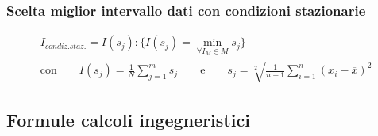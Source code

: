 \documentclass[a4paper,10pt]{article}                                                                                       %
\begin{document}
\subsubsection{Scelta miglior intervallo dati con condizioni stazionarie}                                                   %
\label{subsubsec:daf_interv}                                                                                                %
\vspace{1mm}                                                                                                                %
\begin{equation}                                                                                                            %
  \begin{aligned}                                                                                                           %
  I_{condiz.staz.} = I(s_j) : \{I(s_j) = \min_{\forall I_M \in M} s_j\}\qquad\qquad                                         %
  \\\text{con}\qquad                                                                                                        %
  I(s_j) = \frac{1}{N}\sum_{j=1}^{m}{s_j}                                                                                   %
  \qquad\text{e}\qquad                                                                                                      %
  s_j = \sqrt[2]{\frac{1}{n-1}\sum_{i=1}^{n}(x_i-\overline{x})^2}                                                           %
  \label{eqn:stat}                                                                                                          %
  \end{aligned}                                                                                                             %
\end{equation}                                                                                                              %
\vspace{3mm}                                                                                                                %
\subsection{Formule calcoli ingegneristici}                                                                                 %
\label{subsec:ec_formulas}                                                                                                  %
\end{document}
